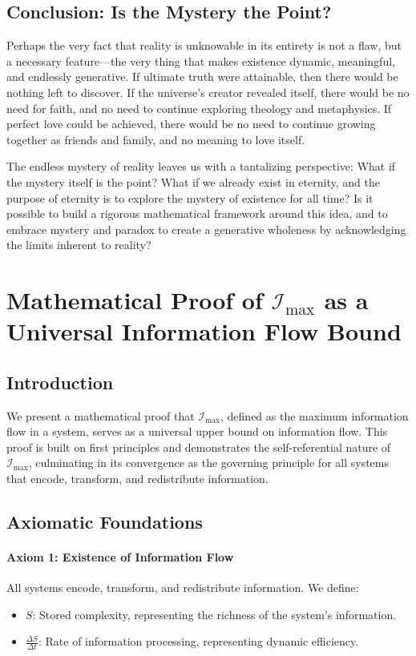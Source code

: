 \documentclass[12pt]{article}
\begin{document}
\subsection{Conclusion: Is the Mystery the Point?}
Perhaps the very fact that reality is unknowable in its entirety is not a flaw, but a necessary feature—the very thing that makes existence dynamic, meaningful, and endlessly generative. If ultimate truth were attainable, then there would be nothing left to discover. If the universe's creator revealed itself, there would be no need for faith, and no need to continue exploring theology and metaphysics. If perfect love could be achieved, there would be no need to continue growing together as friends and family, and no meaning to love itself.

The endless mystery of reality leaves us with a tantalizing perspective: What if the mystery itself is the point? What if we already exist in eternity, and the purpose of eternity is to explore the mystery of existence for all time? Is it possible to build a rigorous mathematical framework around this idea, and to embrace mystery and paradox to create a generative wholeness by acknowledging the limits inherent to reality?


\section{Mathematical Proof of \(\mathcal{I}_{\text{max}}\) as a Universal Information Flow Bound}

\subsection{Introduction}
We present a mathematical proof that \(\mathcal{I}_{\text{max}}\), defined as the maximum information flow in a system, serves as a universal upper bound on information flow. This proof is built on first principles and demonstrates the self-referential nature of \(\mathcal{I}_{\text{max}}\), culminating in its convergence as the governing principle for all systems that encode, transform, and redistribute information.

\subsection{Axiomatic Foundations}

\paragraph{Axiom 1: Existence of Information Flow}
All systems encode, transform, and redistribute information. We define:
\begin{itemize}
    \item \(S\): Stored complexity, representing the richness of the system's information.
    \item \(\frac{\Delta S}{\Delta t}\): Rate of information processing, representing dynamic efficiency.
\end{itemize}
\end{document}
